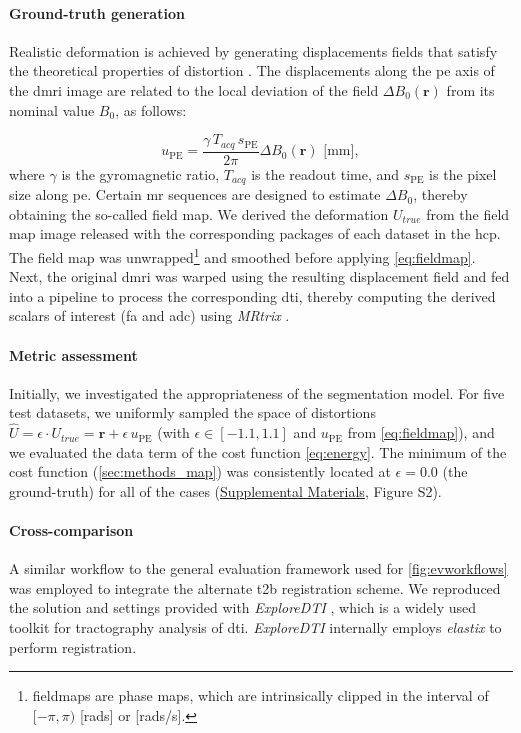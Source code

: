 \documentclass[3p,authoryear,fleqn]{elsarticle}
\renewcommand{\vec}[1]{\mathbf{#1}}
\providecommand{\suppl}[1]{\href{http://figshare.com/s/459c26b4ee8211e493b306ec4bbcf141}{Supplemental Materials}, #1}
\begin{document}
\paragraph*{Ground-truth generation}
Realistic deformation is achieved by generating displacements fields that satisfy the theoretical
  properties of distortion \citep{jezzard_correction_1995}.
The displacements along the \gls*{pe} axis of the \gls*{dmri} image are related to the local
  deviation of the field $\Delta B_0(\vec{r})$ from its nominal value $B_0$, as follows:

  \begin{equation}
  u_\text{PE} = \frac{\gamma \, T_{acq}\, s_\text{PE}}{2\pi}\Delta B_0(\vec{r})\text{ [mm]},
  \label{eq:fieldmap}
  \end{equation}
where $\gamma$ is the gyromagnetic ratio, $T_{acq}$ is the readout time, and
  $s_\text{PE}$ is the pixel size along \gls*{pe}.
Certain \gls*{mr} sequences are designed to estimate $\Delta B_0$, thereby obtaining
  the so-called field map.
We derived the deformation $U_{true}$ from the field map image released with
  the corresponding packages of each dataset in the \gls*{hcp}.
The field map was unwrapped\footnote{fieldmaps are phase maps, which are intrinsically clipped in the interval
  of $[-\pi, \pi)$ [rads] or [rads/s].} and smoothed before applying \eqref{eq:fieldmap}.
Next, the original \gls*{dmri} was warped using the resulting displacement field and fed into
  a pipeline to process the corresponding \gls*{dti}, thereby computing the derived scalars of
  interest (\gls*{fa} and \gls*{adc}) using \emph{MRtrix} \citep{tournier_mrtrix_2012}.

\paragraph*{Metric assessment}
Initially, we investigated the appropriateness of the segmentation model.
For five test datasets, we uniformly sampled the space of distortions
  $\hat{U} = \epsilon \cdot U_{true} = \vec{r} + \epsilon \, u_\text{PE}$
  (with $\epsilon \in [-1.1, 1.1]$ and $u_\text{PE}$ from \eqref{eq:fieldmap}),
  and we evaluated the data term of the cost function \eqref{eq:energy}.
The minimum of the cost function (\autoref{sec:methods_map}) was consistently located at 
  $\epsilon=0.0$ (the ground-truth) for all of the cases (\suppl{Figure S2}).

\paragraph*{Cross-comparison}
A similar workflow to the general evaluation framework used for \autoref{fig:evworkflows}
  was employed to integrate the alternate \gls*{t2b} registration scheme.
We reproduced the solution and settings provided with \emph{ExploreDTI}
  \citep{leemans_exploredti_2009}, which is a widely used toolkit for tractography analysis of
  \gls*{dti}.
\emph{ExploreDTI} internally employs \emph{elastix} \citep{klein_elastix_2010} to
  perform registration.
\end{document}

